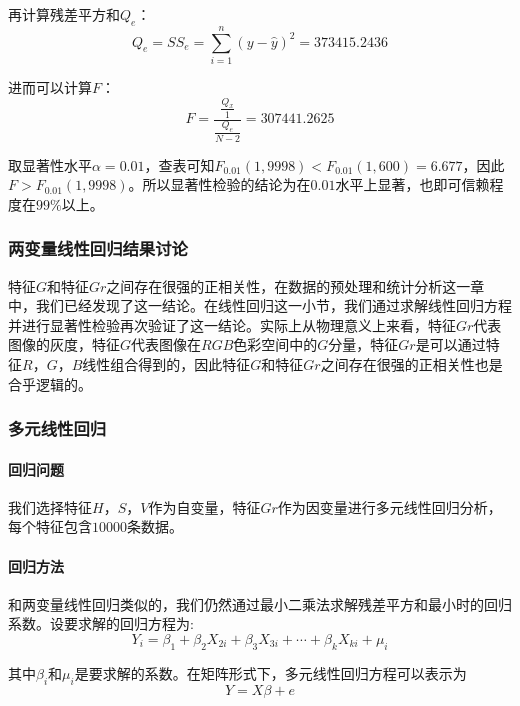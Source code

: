 \documentclass[UTF8]{ctexart}
\begin{document}
	再计算残差平方和$Q_e$：
	\begin{equation*}
	Q_e = SS_e = \sum\limits_{i=1}^{n}(y - \hat{y})^2 = 373415.2436
	\end{equation*}
	
	进而可以计算$F$：
	\begin{equation*}
	F = \frac{\frac{Q_x}{1}}{\frac{Q_e}{N-2}} = 307441.2625
	\end{equation*}
	
	取显著性水平$\alpha=0.01$，查表可知$F_{0.01}(1, 9998) < F_{0.01}(1, 600)=6.677$，因此$F > F_{0.01}(1, 9998)$。所以显著性检验的结论为在$0.01$水平上显著，也即可信赖程度在$99\%$以上。
	
	\subsubsection{两变量线性回归结果讨论}
	特征$G$和特征$Gr$之间存在很强的正相关性，在数据的预处理和统计分析这一章中，我们已经发现了这一结论。在线性回归这一小节，我们通过求解线性回归方程并进行显著性检验再次验证了这一结论。实际上从物理意义上来看，特征$Gr$代表图像的灰度，特征$G$代表图像在$RGB$色彩空间中的$G$分量，特征$Gr$是可以通过特征$R$，$G$，$B$线性组合得到的，因此特征$G$和特征$Gr$之间存在很强的正相关性也是合乎逻辑的。
	
	\subsubsection{多元线性回归}
	
	\paragraph{回归问题} 我们选择特征$H$，$S$，$V$作为自变量，特征$Gr$作为因变量进行多元线性回归分析，每个特征包含$10000$条数据。
	
	\paragraph{回归方法} 和两变量线性回归类似的，我们仍然通过最小二乘法求解残差平方和最小时的回归系数。设要求解的回归方程为:
	\begin{equation*}
	Y_i = \beta_1 + \beta_2X_{2i} + \beta_3X_{3i} + \cdots + \beta_kX_{ki} + \mu_i
	\end{equation*}
	
	其中$\beta_i$和$\mu_i$是要求解的系数。在矩阵形式下，多元线性回归方程可以表示为
	\begin{equation*}
	Y = X\beta + e
	\end{equation*}
	
\end{document}
